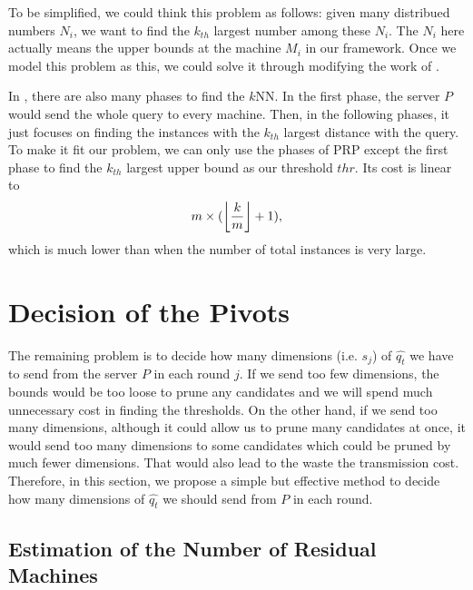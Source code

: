 To be simplified, we could think this problem as follows: given many distribued numbers $N_i$, we want to find the $k_{th}$ largest number among these $N_i$.  The $N_i$ here actually means the upper bounds at the machine $M_i$ in our framework.  Once we model this problem as this, we could solve it through modifying the work of \cite{PRP}.

In \cite{PRP}, there are also many phases to find the $k$NN.  In the first phase, the server $P$ would send the whole query to every machine.  Then, in the following phases, it just focuses on finding the instances with the $k_{th}$ largest distance with the query.  To make it fit our problem, we can only use the phases of PRP except the first phase to find the $k_{th}$ largest upper bound as our threshold $thr$.  Its cost is linear to
\[
m\times (\left \lfloor \frac{k}{m} \right \rfloor+1),
\] which is much lower than \cite{MsWave} when the number of total instances is very large.




\section{Decision of the Pivots} %
\label{s:decide_the_pivots}

The remaining problem is to decide how many dimensions (i.e. $s_j$) of $\hat{q_t}$ we have to send from the server $P$ in each round $j$.  If we send too few dimensions, the bounds would be too loose to prune any candidates and we will spend much unnecessary cost in finding the thresholds.  On the other hand, if we send too many dimensions, although it could allow us to prune many candidates at once, it would send too many dimensions to some candidates which could be pruned by much fewer dimensions.  That would also lead to the waste the transmission cost.  Therefore, in this section, we propose a simple but effective method to decide how many dimensions of $\hat{q_t}$ we should send from $P$ in each round.


\subsection{Estimation of the Number of Residual Machines} %
\label{ss:estimate_the_number_of_residual_machines}

